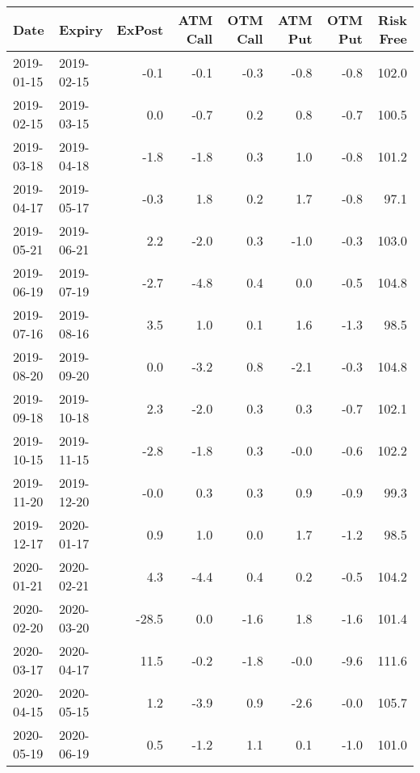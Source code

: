 \begin{tabular}{llrrrrrr}
\hline
 Date       & Expiry     &   ExPost &   ATM Call &   OTM Call &   ATM Put &   OTM Put &   Risk Free \\
\hline
 2019-01-15 & 2019-02-15 &     -0.1 &       -0.1 &       -0.3 &      -0.8 &      -0.8 &       102.0 \\
 2019-02-15 & 2019-03-15 &      0.0 &       -0.7 &        0.2 &       0.8 &      -0.7 &       100.5 \\
 2019-03-18 & 2019-04-18 &     -1.8 &       -1.8 &        0.3 &       1.0 &      -0.8 &       101.2 \\
 2019-04-17 & 2019-05-17 &     -0.3 &        1.8 &        0.2 &       1.7 &      -0.8 &        97.1 \\
 2019-05-21 & 2019-06-21 &      2.2 &       -2.0 &        0.3 &      -1.0 &      -0.3 &       103.0 \\
 2019-06-19 & 2019-07-19 &     -2.7 &       -4.8 &        0.4 &       0.0 &      -0.5 &       104.8 \\
 2019-07-16 & 2019-08-16 &      3.5 &        1.0 &        0.1 &       1.6 &      -1.3 &        98.5 \\
 2019-08-20 & 2019-09-20 &      0.0 &       -3.2 &        0.8 &      -2.1 &      -0.3 &       104.8 \\
 2019-09-18 & 2019-10-18 &      2.3 &       -2.0 &        0.3 &       0.3 &      -0.7 &       102.1 \\
 2019-10-15 & 2019-11-15 &     -2.8 &       -1.8 &        0.3 &      -0.0 &      -0.6 &       102.2 \\
 2019-11-20 & 2019-12-20 &     -0.0 &        0.3 &        0.3 &       0.9 &      -0.9 &        99.3 \\
 2019-12-17 & 2020-01-17 &      0.9 &        1.0 &        0.0 &       1.7 &      -1.2 &        98.5 \\
 2020-01-21 & 2020-02-21 &      4.3 &       -4.4 &        0.4 &       0.2 &      -0.5 &       104.2 \\
 2020-02-20 & 2020-03-20 &    -28.5 &        0.0 &       -1.6 &       1.8 &      -1.6 &       101.4 \\
 2020-03-17 & 2020-04-17 &     11.5 &       -0.2 &       -1.8 &      -0.0 &      -9.6 &       111.6 \\
 2020-04-15 & 2020-05-15 &      1.2 &       -3.9 &        0.9 &      -2.6 &      -0.0 &       105.7 \\
 2020-05-19 & 2020-06-19 &      0.5 &       -1.2 &        1.1 &       0.1 &      -1.0 &       101.0 \\

\end{tabular}
